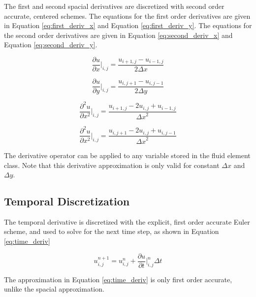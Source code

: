 The first and second spacial derivatives are discretized with second order accurate, centered schemes.  The equations for the first order derivatives are given in Equation \ref{eq:first_deriv_x} and Equation \ref{eq:first_deriv_y}.  The equations for the second order derivatives are given in Equation \ref{eq:second_deriv_x} and Equation \ref{eq:second_deriv_y}.

\begin{equation} 
\label{eq:first_deriv_x}
\frac{\partial u}{\partial x}\bigg|_{i,j} = \frac{u_{ i+1,j} - u_{ i-1,j}}{2\Delta x} 
\end{equation}

\begin{equation} 
\label{eq:first_deriv_y}
\frac{\partial u}{\partial y}\bigg|_{i,j} = \frac{u_{ i,j+1} - u_{ i,j-1}}{2\Delta y}
\end{equation}

\begin{equation} 
\label{eq:second_deriv_x}
\frac{\partial^2 u}{\partial x^2}\bigg|_{i,j} = \frac{u_{ i+1,j} - 2 u_{ i,j} + u_{ i-1,j} }{{\Delta x}^2} 
\end{equation}

\begin{equation} 
\label{eq:second_deriv_y}
\frac{\partial^2 u}{\partial x^2}\bigg|_{i,j} = \frac{u_{ i,j+1} - 2 u_{ i,j} + u_{ i,j-1} }{{\Delta x}^2} 
\end{equation}

The derivative operator can be applied to any variable stored in the fluid element class.  Note that this derivative approximation is only valid for constant $\Delta x$ and $\Delta y$.


	\subsection{Temporal Discretization}

The temporal derivative is discretized with the explicit, first order accurate Euler scheme, and used to solve for the next time step, as shown in Equation \ref{eq:time_deriv}

\begin{equation}
\label{eq:time_deriv}
u_{i,j}^{n+1} = u_{i,j}^{n} + \frac{\partial u}{\partial t}\bigg|_{i,j}^{n} \Delta t
\end{equation}

The approximation in Equation \ref{eq:time_deriv} is only first order accurate, unlike the spacial approximation.  


